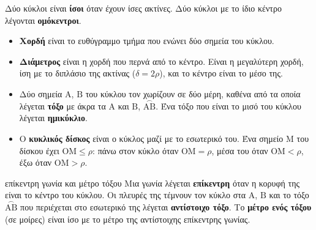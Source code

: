 Δύο κύκλοι είναι \textbf{ίσοι} όταν έχουν ίσες ακτίνες. Δύο κύκλοι με το ίδιο κέντρο λέγονται \textbf{ομόκεντροι}.

\begin{center}
\end{center}

\begin{itemize}[leftmargin=1.2em,itemsep=0.3ex,topsep=2pt]
\item \textbf{Χορδή} είναι το ευθύγραμμο τμήμα που ενώνει δύο σημεία του κύκλου.
\item \textbf{Διάμετρος} είναι η χορδή που περνά από το κέντρο. Είναι η μεγαλύτερη χορδή, ίση με το διπλάσιο της ακτίνας ($\delta=2\rho$), και το κέντρο είναι το μέσο της.
\item Δύο σημεία $\mathrm{Α}$, $\mathrm{Β}$ του κύκλου τον χωρίζουν σε δύο μέρη, καθένα από τα οποία λέγεται \textbf{τόξο} με άκρα τα $\mathrm{Α}$ και $\mathrm{Β}$, $\overset{\frown}{\mathrm{ΑΒ}}$. Ένα τόξο που είναι το μισό του κύκλου λέγεται \textbf{ημικύκλιο}.
\item Ο \textbf{κυκλικός δίσκος} είναι ο κύκλος μαζί με το εσωτερικό του. Ένα σημείο $\mathrm{Μ}$ του δίσκου έχει $\mathrm{ΟΜ}\le\rho$: πάνω στον κύκλο όταν $\mathrm{ΟΜ}=\rho$, μέσα του όταν $\mathrm{ΟΜ}<\rho$, έξω όταν $\mathrm{ΟΜ}>\rho$.
\end{itemize}

\begin{orismos}{επίκεντρη γωνία και μέτρο τόξου}
Μια γωνία λέγεται \textbf{επίκεντρη} όταν η κορυφή της είναι το κέντρο του κύκλου. Οι πλευρές της τέμνουν τον κύκλο στα $\mathrm{Α}$, $\mathrm{Β}$ και το τόξο $\overset{\frown}{\mathrm{ΑΒ}}$ που περιέχεται στο εσωτερικό της λέγεται \textbf{αντίστοιχο τόξο}. Το \textbf{μέτρο ενός τόξου} (σε μοίρες) είναι ίσο με το μέτρο της αντίστοιχης επίκεντρης γωνίας.
\end{orismos}

